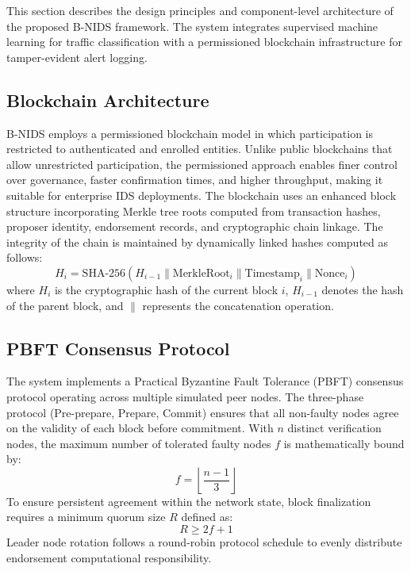 \documentclass[conference]{IEEEtran}
\begin{document}
This section describes the design principles and component-level architecture of the proposed B-NIDS framework. The system integrates supervised machine learning for traffic classification with a permissioned blockchain infrastructure for tamper-evident alert logging.

\subsection{Blockchain Architecture}
B-NIDS employs a permissioned blockchain model in which participation is restricted to authenticated and enrolled entities. Unlike public blockchains that allow unrestricted participation, the permissioned approach enables finer control over governance, faster confirmation times, and higher throughput, making it suitable for enterprise IDS deployments. The blockchain uses an enhanced block structure incorporating Merkle tree roots computed from transaction hashes, proposer identity, endorsement records, and cryptographic chain linkage. The integrity of the chain is maintained by dynamically linked hashes computed as follows:
\begin{equation}
H_i = \text{SHA-256}(H_{i-1} \parallel \text{MerkleRoot}_i \parallel \text{Timestamp}_i \parallel \text{Nonce}_i)
\end{equation}
where $H_i$ is the cryptographic hash of the current block $i$, $H_{i-1}$ denotes the hash of the parent block, and $\parallel$ represents the concatenation operation.

\subsection{PBFT Consensus Protocol}
The system implements a Practical Byzantine Fault Tolerance (PBFT) consensus protocol operating across multiple simulated peer nodes. The three-phase protocol (Pre-prepare, Prepare, Commit) ensures that all non-faulty nodes agree on the validity of each block before commitment. With $n$ distinct verification nodes, the maximum number of tolerated faulty nodes $f$ is mathematically bound by:
\begin{equation}
f = \left\lfloor \frac{n-1}{3} \right\rfloor
\end{equation}
To ensure persistent agreement within the network state, block finalization requires a minimum quorum size $R$ defined as:
\begin{equation}
R \ge 2f + 1
\end{equation}
Leader node rotation follows a round-robin protocol schedule to evenly distribute endorsement computational responsibility.
\end{document}
